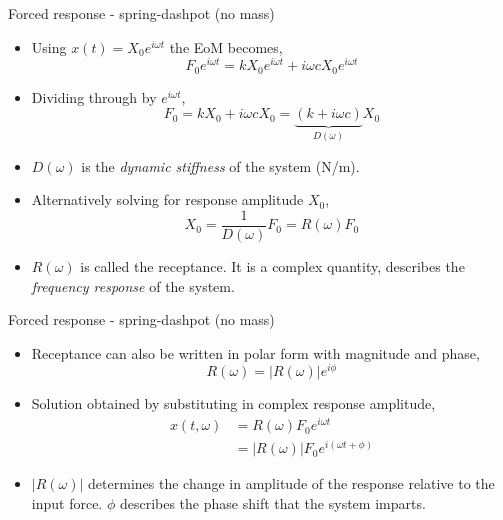 \documentclass[11pt,aspectratio=169,handout]{beamer}
\begin{document}
\begin{frame}[c]{Forced response - spring-dashpot (no mass)}
			\begin{itemize}
				\item<1-> Using $x(t) = X_0 e^{i\omega t}$ the EoM becomes, 
				\begin{equation}\label{}
					F_0 e^{i\omega t} = k X_0 e^{i\omega t} + i\omega c X_0 e^{i\omega t}
				\end{equation}
				\item<2-> Dividing through by $e^{i\omega t}$,
				\begin{equation}\label{}
					F_0 = k X_0 + i\omega c X_0 = \underbrace{(k+i\omega c)}_{D(\omega)} X_0
				\end{equation}
			\item<2-> $D(\omega)$ is the \textit{dynamic stiffness} of the system (N/m).
			\item<3-> Alternatively solving for response amplitude $X_0$, 
			\begin{equation}
				X_0 = \frac{1}{D(\omega)} F_0= R(\omega) F_0
			\end{equation}
			\item<3-> $R(\omega)$ is called the receptance. It is a complex quantity, describes the \textit{frequency response} of the system. 
			\end{itemize}
\end{frame}

\begin{frame}[c]{Forced response - spring-dashpot (no mass)}
	\begin{itemize}
		\item<1-> Receptance can also be written in polar form with magnitude and phase, 
		\begin{equation}
			R(\omega) = |R(\omega) | e^{i\phi}
		\end{equation}
		\item<2-> Solution obtained by substituting in complex response amplitude,
		\begin{align}\label{}
			x(t,\omega) &= R(\omega){F_0 e^{i\omega t}}\\
			&=|R(\omega)| F_0 e^{i(\omega t+\phi)}
		\end{align}
		\item<2-> $|R(\omega)| $ determines the change in amplitude of the response relative to the input force. $\phi$ describes the phase shift that the system imparts. 
	\end{itemize}
\end{frame}
\end{document}

